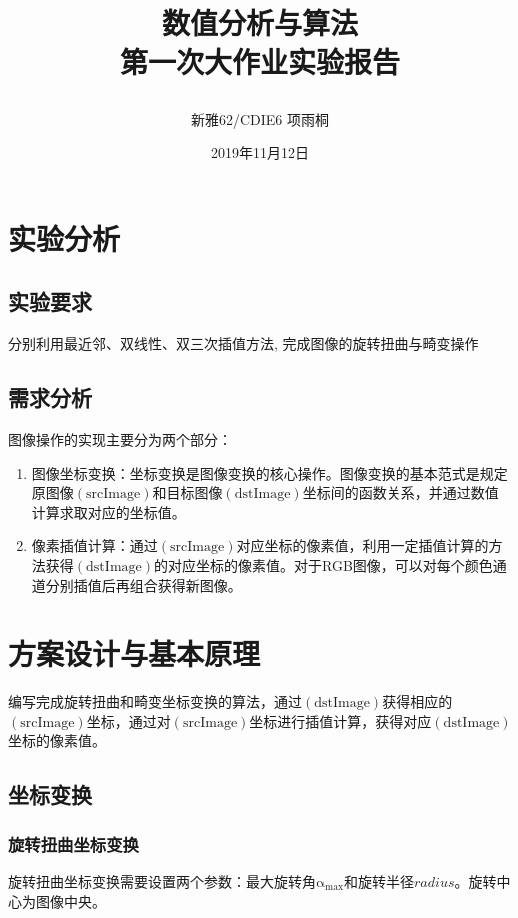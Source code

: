 \documentclass{article}
\title
{
	\normalfont\normalsize
	\textsc{数值分析与算法}\\ %
	\vspace{7cm} %
	{\huge 第一次大作业实验报告}\\ %
	\vspace{6cm} %
	\author{新雅62/CDIE6\quad 2016013327 项雨桐}
	\date{2019年11月12日} 
}
\begin{document}
\maketitle
\thispagestyle{empty}
\newpage
\thispagestyle{empty}
\tableofcontents
\newpage
\section{实验分析}
\setcounter{page}{1}
\setcounter{figure}{0}

\subsection{实验要求}
分别利用最近邻、双线性、双三次插值方法, 完成图像的旋转扭曲与畸变操作

\subsection{需求分析}
\setcounter{figure}{0}
图像操作的实现主要分为两个部分：
\begin{enumerate}
	\item 图像坐标变换：坐标变换是图像变换的核心操作。图像变换的基本范式是规定原图像$\mathrm{(srcImage)}$和目标图像$\mathrm{(dstImage)}$坐标间的函数关系，并通过数值计算求取对应的坐标值。
	\item 像素插值计算：通过$\mathrm{(srcImage)}$对应坐标的像素值，利用一定插值计算的方法获得$\mathrm{(dstImage)}$的对应坐标的像素值。对于RGB图像，可以对每个颜色通道分别插值后再组合获得新图像。
\end{enumerate} 

\section{方案设计与基本原理}
\setcounter{figure}{0}

编写完成旋转扭曲和畸变坐标变换的算法，通过$\mathrm{(dstImage)}$获得相应的$\mathrm{(srcImage)}$坐标，通过对$\mathrm{(srcImage)}$坐标进行插值计算，获得对应$\mathrm{(dstImage)}$坐标的像素值。

\subsection{坐标变换}
\subsubsection{旋转扭曲坐标变换}

旋转扭曲坐标变换需要设置两个参数：最大旋转角$\mathrm{\alpha_{max}}$和旋转半径$radius$。旋转中心为图像中央。
\end{document}
